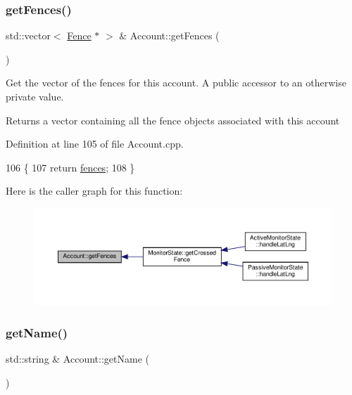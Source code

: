 \subsubsection{\texorpdfstring{get\+Fences()}{getFences()}}
{\footnotesize\ttfamily std\+::vector$<$ \hyperlink{class_fence}{Fence} $\ast$ $>$ \& Account\+::get\+Fences (\begin{DoxyParamCaption}{ }\end{DoxyParamCaption})}

Get the vector of the fences for this account. A public accessor to an otherwise private value.

\begin{DoxyReturn}{Returns}
a vector containing all the fence objects associated with this account 
\end{DoxyReturn}


Definition at line 105 of file Account.\+cpp.


\begin{DoxyCode}
106 \{
107     \textcolor{keywordflow}{return} \hyperlink{class_account_ad92a9e8008371f34da06cd416a716fa1}{fences};
108 \}
\end{DoxyCode}
Here is the caller graph for this function\+:\nopagebreak
\begin{figure}[H]
\begin{center}
\leavevmode
\includegraphics[width=350pt]{db/d22/class_account_a5117acc0c4ef7be21c5339bd9ae84e40_icgraph}
\end{center}
\end{figure}
\mbox{\label{class_account_a1ef22885e8c6f145475c3306a4e6d74a}} 
\subsubsection{\texorpdfstring{get\+Name()}{getName()}}
{\footnotesize\ttfamily std\+::string \& Account\+::get\+Name (\begin{DoxyParamCaption}{ }\end{DoxyParamCaption})}


